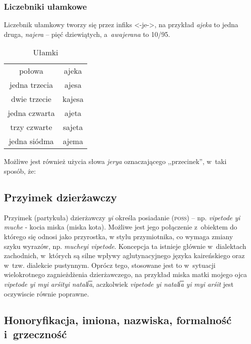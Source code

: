 \begin{spacing}{1.1}
\subsubsection{Liczebniki ułamkowe}

Liczebnik ułamkowy tworzy się przez infiks <-je->, na przykład \emph{ajeka} to
jedna druga, \emph{najera} -- pięć dziewiątych, a~\emph{awajerana} to 10/95.

\begin{table}[ht]
	\centering
	\caption{Ułamki}
	\begin{tabular}{cc} \toprule
		połowa & ajeka \\
		jedna trzecia & ajesa \\
		dwie trzecie & kajesa \\
		jedna czwarta & ajeta \\
		trzy czwarte & sajeta \\
		jedna siódma & ajema  \\\bottomrule
	\end{tabular}
	\label{tab:numerals4}
\end{table}

Możliwe jest również użycia słowa \emph{jerya} oznaczającego ,,przecinek'',
w~taki sposób, że:


\subsection{Przyimek dzierżawczy}

Przyimek (partykuła) dzierżawczy \emph{yi} określa posiadanie (\textsc{poss}) --
np. \emph{vipetode yi muche} - kocia miska (miska kota). Możliwe jest jego
połączenie z~obiektem do którego się odnosi jako przyrostka, w stylu
przymiotnika, co wymaga zmiany szyku wyrazów, np. \emph{mucheyi vipetode}.
Koncepcja ta istnieje głównie w~dialektach zachodnich, w~których są silne wpływy
aglutynacyjnego języka kaireńskiego oraz w~tzw. dialekcie pustynnym. Oprócz
tego, stosowane jest to w~sytuacji wielokrotnego zagnieżdżenia dzierżawczego, na
przykład miska matki mojego ojca \emph{vipetode yi myi arśityi natali͞a},
aczkolwiek \emph{vipetode yi natali͞a yi myi arśit} jest oczywiscie równie
poprawne. 

\subsection{Honoryfikacja, imiona, nazwiska, formalność i~grzeczność}


\end{spacing}
